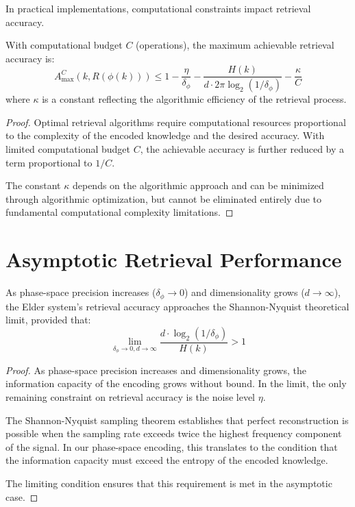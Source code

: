 In practical implementations, computational constraints impact retrieval accuracy.

\begin{theorem}
With computational budget $C$ (operations), the maximum achievable retrieval accuracy is:
\begin{equation}
A_{\max}^C(k, R(\phi(k))) \leq 1 - \frac{\eta}{\delta_\phi} - \frac{H(k)}{d \cdot 2\pi \log_2(1/\delta_\phi)} - \frac{\kappa}{C}
\end{equation}
where $\kappa$ is a constant reflecting the algorithmic efficiency of the retrieval process.
\end{theorem}

\begin{proof}
Optimal retrieval algorithms require computational resources proportional to the complexity of the encoded knowledge and the desired accuracy. With limited computational budget $C$, the achievable accuracy is further reduced by a term proportional to $1/C$.

The constant $\kappa$ depends on the algorithmic approach and can be minimized through algorithmic optimization, but cannot be eliminated entirely due to fundamental computational complexity limitations.
\end{proof}

\section{Asymptotic Retrieval Performance}

\begin{theorem}
As phase-space precision increases ($\delta_\phi \rightarrow 0$) and dimensionality grows ($d \rightarrow \infty$), the Elder system's retrieval accuracy approaches the Shannon-Nyquist theoretical limit, provided that:
\begin{equation}
\lim_{\delta_\phi \rightarrow 0, d \rightarrow \infty} \frac{d \cdot \log_2(1/\delta_\phi)}{H(k)} > 1
\end{equation}
\end{theorem}

\begin{proof}
As phase-space precision increases and dimensionality grows, the information capacity of the encoding grows without bound. In the limit, the only remaining constraint on retrieval accuracy is the noise level $\eta$.

The Shannon-Nyquist sampling theorem establishes that perfect reconstruction is possible when the sampling rate exceeds twice the highest frequency component of the signal. In our phase-space encoding, this translates to the condition that the information capacity must exceed the entropy of the encoded knowledge.

The limiting condition ensures that this requirement is met in the asymptotic case.
\end{proof}

